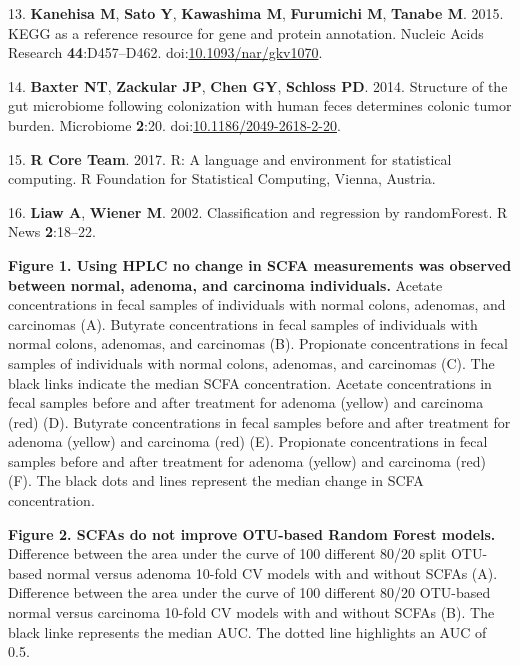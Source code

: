\documentclass[11pt,]{article}
\begin{document}
\hypertarget{ref-Kanehisa2015}{}
13. \textbf{Kanehisa M}, \textbf{Sato Y}, \textbf{Kawashima M},
\textbf{Furumichi M}, \textbf{Tanabe M}. 2015. KEGG as a reference
resource for gene and protein annotation. Nucleic Acids Research
\textbf{44}:D457--D462.
doi:\href{https://doi.org/10.1093/nar/gkv1070}{10.1093/nar/gkv1070}.

\hypertarget{ref-scfa_baxter2014}{}
14. \textbf{Baxter NT}, \textbf{Zackular JP}, \textbf{Chen GY},
\textbf{Schloss PD}. 2014. Structure of the gut microbiome following
colonization with human feces determines colonic tumor burden.
Microbiome \textbf{2}:20.
doi:\href{https://doi.org/10.1186/2049-2618-2-20}{10.1186/2049-2618-2-20}.

\hypertarget{ref-r_citation_2017}{}
15. \textbf{R Core Team}. 2017. R: A language and environment for
statistical computing. R Foundation for Statistical Computing, Vienna,
Austria.

\hypertarget{ref-randomforest_citation_2002}{}
16. \textbf{Liaw A}, \textbf{Wiener M}. 2002. Classification and
regression by randomForest. R News \textbf{2}:18--22.

\newpage

\textbf{Figure 1. Using HPLC no change in SCFA measurements was observed
between normal, adenoma, and carcinoma individuals.} Acetate
concentrations in fecal samples of individuals with normal colons,
adenomas, and carcinomas (A). Butyrate concentrations in fecal samples
of individuals with normal colons, adenomas, and carcinomas (B).
Propionate concentrations in fecal samples of individuals with normal
colons, adenomas, and carcinomas (C). The black links indicate the
median SCFA concentration. Acetate concentrations in fecal samples
before and after treatment for adenoma (yellow) and carcinoma (red) (D).
Butyrate concentrations in fecal samples before and after treatment for
adenoma (yellow) and carcinoma (red) (E). Propionate concentrations in
fecal samples before and after treatment for adenoma (yellow) and
carcinoma (red) (F). The black dots and lines represent the median
change in SCFA concentration.

\textbf{Figure 2. SCFAs do not improve OTU-based Random Forest models.}
Difference between the area under the curve of 100 different 80/20 split
OTU-based normal versus adenoma 10-fold CV models with and without SCFAs
(A). Difference between the area under the curve of 100 different 80/20
OTU-based normal versus carcinoma 10-fold CV models with and without
SCFAs (B). The black linke represents the median AUC. The dotted line
highlights an AUC of 0.5.
\end{document}
